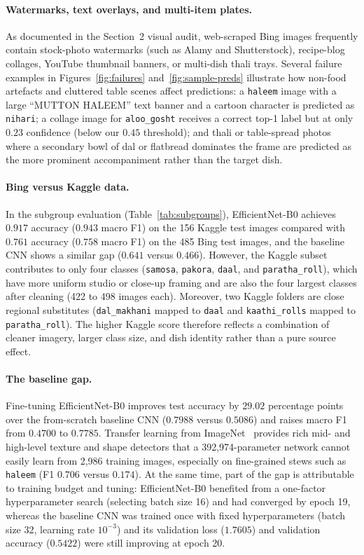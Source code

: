 \documentclass[11pt,a4paper]{article}
\begin{document}
\paragraph{Watermarks, text overlays, and multi-item plates.}
As documented in the Section~2 visual audit, web-scraped Bing images frequently
contain stock-photo watermarks (such as Alamy and Shutterstock), recipe-blog
collages, YouTube thumbnail banners, or multi-dish thali trays. Several failure
examples in Figures~\ref{fig:failures} and~\ref{fig:sample-preds} illustrate
how non-food artefacts and cluttered table scenes affect predictions: a
\texttt{haleem} image with a large ``MUTTON HALEEM'' text banner and a cartoon
character is predicted as \texttt{nihari}; a collage image for
\texttt{aloo\_gosht} receives a correct top-1 label but at only $0.23$
confidence (below our $0.45$ threshold); and thali or table-spread photos where
a secondary bowl of dal or flatbread dominates the frame are predicted as the
more prominent accompaniment rather than the target dish.

\paragraph{Bing versus Kaggle data.}
In the subgroup evaluation (Table~\ref{tab:subgroups}), EfficientNet-B0 achieves
$0.917$ accuracy ($0.943$ macro F1) on the 156 Kaggle test images compared with
$0.761$ accuracy ($0.758$ macro F1) on the 485 Bing test images, and the
baseline CNN shows a similar gap ($0.641$ versus $0.466$). However, the Kaggle
subset~\cite{jain_indian_food_kaggle} contributes to only four classes
(\texttt{samosa}, \texttt{pakora}, \texttt{daal}, and \texttt{paratha\_roll}),
which have more uniform studio or close-up framing and are also the four
largest classes after cleaning (422 to 498 images each). Moreover, two Kaggle
folders are close regional substitutes (\texttt{dal\_makhani} mapped to
\texttt{daal} and \texttt{kaathi\_rolls} mapped to \texttt{paratha\_roll}). The
higher Kaggle score therefore reflects a combination of cleaner imagery, larger
class size, and dish identity rather than a pure source effect.

\paragraph{The baseline gap.}
Fine-tuning EfficientNet-B0 improves test accuracy by $29.02$ percentage points
over the from-scratch baseline CNN ($0.7988$ versus $0.5086$) and raises macro
F1 from $0.4700$ to $0.7785$. Transfer learning from ImageNet~\cite{deng2009imagenet}
provides rich mid- and high-level texture and shape detectors that a
392,974-parameter network cannot easily learn from 2,986 training images,
especially on fine-grained stews such as \texttt{haleem} (F1 $0.706$ versus
$0.174$). At the same time, part of the gap is attributable to training budget
and tuning: EfficientNet-B0 benefited from a one-factor hyperparameter search
(selecting batch size 16) and had converged by epoch 19, whereas the baseline
CNN was trained once with fixed hyperparameters (batch size 32, learning rate
$10^{-3}$) and its validation loss ($1.7605$) and validation accuracy ($0.5422$)
were still improving at epoch 20.
\end{document}
